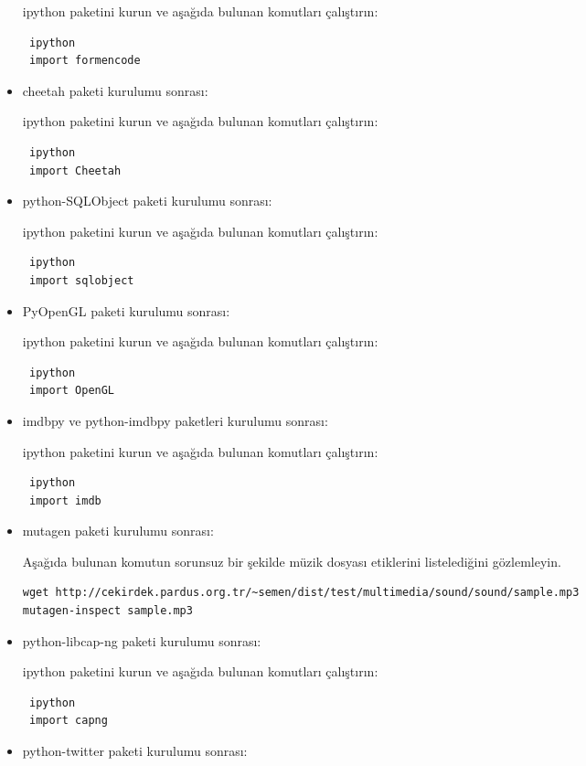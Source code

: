 \documentclass[a4paper,10pt]{article}
\begin{document}
\begin{itemize}
ipython paketini kurun ve aşağıda bulunan komutları çalıştırın:
\begin{verbatim}
 ipython
 import formencode
\end{verbatim}

\item cheetah  paketi kurulumu sonrası:

ipython paketini kurun ve aşağıda bulunan komutları çalıştırın:
\begin{verbatim}
 ipython
 import Cheetah
\end{verbatim}


\item python-SQLObject  paketi kurulumu sonrası:

ipython paketini kurun ve aşağıda bulunan komutları çalıştırın:
\begin{verbatim}
 ipython
 import sqlobject
\end{verbatim}

\item PyOpenGL  paketi kurulumu sonrası:

ipython paketini kurun ve aşağıda bulunan komutları çalıştırın:
\begin{verbatim}
 ipython
 import OpenGL
\end{verbatim}

\item imdbpy ve python-imdbpy  paketleri kurulumu sonrası:

ipython paketini kurun ve aşağıda bulunan komutları çalıştırın:
\begin{verbatim}
 ipython
 import imdb
\end{verbatim}

\item mutagen  paketi kurulumu sonrası:

Aşağıda bulunan komutun sorunsuz bir şekilde müzik dosyası etiklerini listelediğini gözlemleyin.
\begin{verbatim}
wget http://cekirdek.pardus.org.tr/~semen/dist/test/multimedia/sound/sound/sample.mp3 
mutagen-inspect sample.mp3
\end{verbatim}


\item python-libcap-ng  paketi kurulumu sonrası:

ipython paketini kurun ve aşağıda bulunan komutları çalıştırın:
\begin{verbatim}
 ipython
 import capng
\end{verbatim}

\item python-twitter paketi kurulumu sonrası:


\end{itemize}
\end{document}
